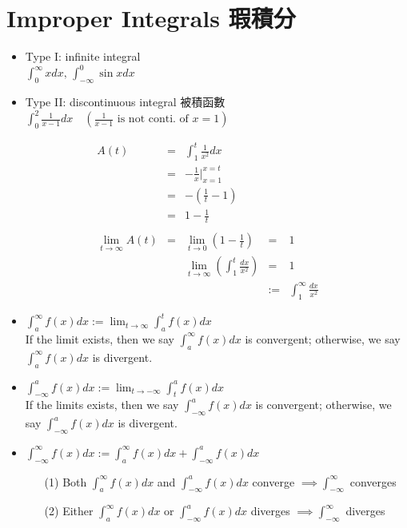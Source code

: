 \section{Improper Integrals 瑕積分}
\begin{itemize}
\item Type I: infinite integral\\
\( \displaystyle \int^{\infty}_0 x dx \text{, } \int^0_{-\infty} \sin x dx\)
\item Type II: discontinuous integral 被積函數\\
\( \displaystyle \int^2_0 \frac{1}{x-1}dx \quad (\frac{1}{x-1} \text{ is not conti. of } x = 1)\)
\end{itemize}
\begin{eg}
\[\begin{array}{rcccl}
A(t) & = & \displaystyle \int^t_1 \frac{1}{x^2} dx\\
& = & \displaystyle -\frac{1}{x} \Big|^{x = t}_{x = 1}\\
& = & \displaystyle - (\frac{1}{t} -1)\\
& = & \displaystyle 1 - \frac{1}{t}\\\\
\displaystyle \lim_{t \to \infty} A(t) & = & \displaystyle \lim_{t \to 0} (1 - \frac{1}{t}) & = & 1\\
&& \displaystyle \lim_{t \to \infty} (\int^t_1 \frac{dx}{x^2}) & = & 1\\
&&& := & \displaystyle \int^{\infty}_1 \frac{dx}{x^2}
\end{array}\]
\end{eg}
\begin{defn}
\begin{itemize}
\item \(\displaystyle \int^{\infty}_a f(x)dx := \lim_{t \to \infty} \int^t_a f(x)dx\)\\
If the limit exists, then we say \(\displaystyle \int^{\infty}_a f(x)dx\) is convergent; otherwise, we say \(\displaystyle \int^{\infty}_a f(x)dx\) is divergent.
\item \( \displaystyle \int^a_{-\infty} f(x)dx := \lim_{t \to -\infty} \int^a_t f(x)dx\)\\
If the limits exists, then we say \( \displaystyle \int^a_{-\infty} f(x)dx\) is convergent; otherwise, we say \( \displaystyle \int^a_{-\infty} f(x)dx\) is divergent.
\item \( \displaystyle \int^{\infty}_{-\infty} f(x)dx := \int^{\infty}_a f(x)dx + \int^a_{-\infty} f(x)dx\)\\
\begin{itemize}
\item[(1)] Both \( \displaystyle \int^{\infty}_a f(x)dx\) and \( \displaystyle \int^a_{-\infty} f(x)dx\) converge \( \implies \displaystyle \int^{\infty}_{-\infty}\) converges
\item[(2)] Either \( \displaystyle \int^{\infty}_a f(x)dx\) or \( \displaystyle \int^a_{-\infty} f(x)dx\) diverges \( \implies \displaystyle \int^{\infty}_{-\infty}\) diverges
\end{itemize}
\end{itemize}
\end{defn}
